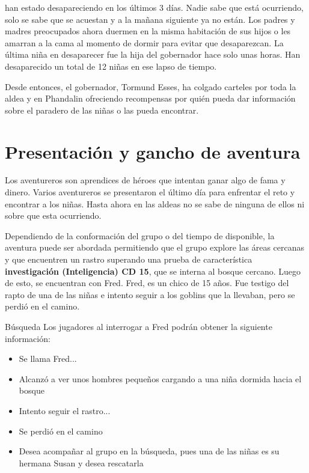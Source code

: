\documentclass[10pt,twoside,twocolumn,openany]{dndbook}
\begin{document}
 han estado desapareciendo en los 
últimos 3 días. Nadie sabe que está ocurriendo, solo se sabe que se acuestan y a la mañana 
siguiente ya no están. Los padres y madres preocupados ahora duermen en la misma habitación de
sus hijos o les amarran a la cama al momento de dormir para evitar que desaparezcan. La última 
niña en desaparecer fue la hija del gobernador hace solo unas horas. Han desaparecido un total de 
12 niñas en ese lapso de tiempo.

Desde entonces, el gobernador, Tormund Esses, ha colgado carteles por toda la aldea y en Phandalin 
ofreciendo recompensas por quién pueda dar información sobre el paradero de las niñas o las pueda 
encontrar.

\section{Presentación y gancho de aventura}

Los aventureros son aprendices de héroes que intentan ganar algo de fama y dinero. Varios aventureros 
se presentaron el último día para enfrentar el reto y encontrar a los niñas. Hasta ahora en las 
aldeas no se sabe de ninguna de ellos ni sobre que esta ocurriendo.

Dependiendo de la conformación del grupo o del tiempo de disponible, la aventura puede ser abordada
permitiendo que el grupo explore las áreas cercanas y que encuentren un rastro superando una 
prueba de característica \textbf{investigación (Inteligencia) CD 15}, que se interna al bosque 
cercano. Luego de esto, se encuentran con Fred. Fred, es un chico de 15 años. Fue testigo del 
rapto de una de las niñas e intento seguir a los goblins que la llevaban, pero se perdió en el 
camino.

\begin{DndComment}{Búsqueda}
  Los jugadores al interrogar a Fred podrán obtener la siguiente información:

  \begin{itemize}
    \item Se llama Fred...
    \item Alcanzó a ver unos hombres pequeños cargando a una niña dormida hacia el bosque
    \item Intento seguir el rastro...
    \item Se perdió en el camino
    \item Desea acompañar al grupo en la búsqueda, pues una de las niñas es su hermana Susan
    y desea rescatarla
  \end{itemize}
  
\end{DndComment}
\end{document}
